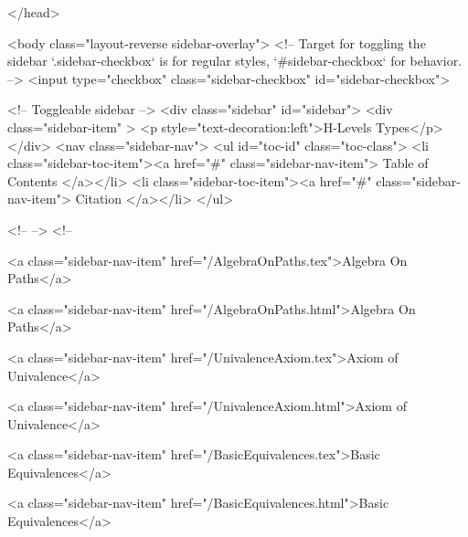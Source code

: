   
</head>




  <body class="layout-reverse sidebar-overlay">
    <!-- Target for toggling the sidebar `.sidebar-checkbox` is for regular
     styles, `#sidebar-checkbox` for behavior. -->
<input type="checkbox" class="sidebar-checkbox" id="sidebar-checkbox">

<!-- Toggleable sidebar -->
<div class="sidebar" id="sidebar">
  <div class="sidebar-item" >
    <p style="text-decoration:left">H-Levels Types</p>
  </div>
  <nav class="sidebar-nav">
    <ul id="toc-id" class="toc-class">
  <li class="sidebar-toc-item"><a href="#" class="sidebar-nav-item"> Table of Contents </a></li>
  <li class="sidebar-toc-item"><a href="#" class="sidebar-nav-item"> Citation </a></li>
</ul>


    <!--  -->
    <!-- 
      
    
      
    
      
    
      
    
      
        
      
    
      
        
          <a class="sidebar-nav-item" href="/AlgebraOnPaths.tex">Algebra On Paths</a>
        
      
    
      
        
          <a class="sidebar-nav-item" href="/AlgebraOnPaths.html">Algebra On Paths</a>
        
      
    
      
        
          <a class="sidebar-nav-item" href="/UnivalenceAxiom.tex">Axiom of Univalence</a>
        
      
    
      
        
          <a class="sidebar-nav-item" href="/UnivalenceAxiom.html">Axiom of Univalence</a>
        
      
    
      
        
          <a class="sidebar-nav-item" href="/BasicEquivalences.tex">Basic Equivalences</a>
        
      
    
      
        
          <a class="sidebar-nav-item" href="/BasicEquivalences.html">Basic Equivalences</a>
        
